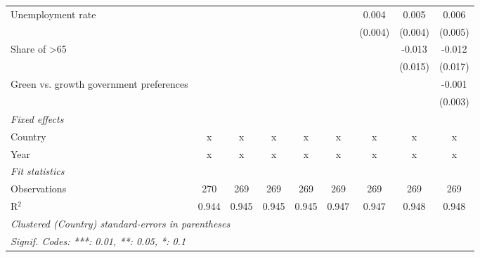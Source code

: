\begin{table}[htbp]
\begin{tabular}{lcccccccc}
      Unemployment rate                                        &         &         &         &         &         & 0.004   & 0.005   & 0.006\\   
                                                               &         &         &         &         &         & (0.004) & (0.004) & (0.005)\\   
      Share of >65                                             &         &         &         &         &         &         & -0.013  & -0.012\\   
                                                               &         &         &         &         &         &         & (0.015) & (0.017)\\   
      Green vs. growth government preferences                  &         &         &         &         &         &         &         & -0.001\\   
                                                               &         &         &         &         &         &         &         & (0.003)\\   
      \emph{Fixed effects}\\
      Country                                                  & x       & x       & x       & x       & x       & x       & x       & x\\  
      Year                                                     & x       & x       & x       & x       & x       & x       & x       & x\\  
      \midrule \emph{Fit statistics}\\
      Observations                                             & 270     & 269     & 269     & 269     & 269     & 269     & 269     & 269\\  
      R$^2$                                                    & 0.944   & 0.945   & 0.945   & 0.945   & 0.947   & 0.947   & 0.948   & 0.948\\  
      \midrule
      \multicolumn{9}{l}{\emph{Clustered (Country) standard-errors in parentheses}}\\
      \multicolumn{9}{l}{\emph{Signif. Codes: ***: 0.01, **: 0.05, *: 0.1}}\\
   \end{tabular}
\end{table}


